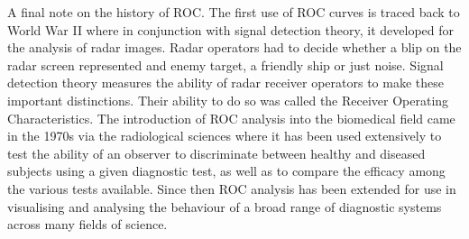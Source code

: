 \documentclass[a4paper,justified]{tufte-handout}
\begin{document}
\begin{fullwidth}
\vspace{3mm}
\noindent A final note on the history of ROC. The first use of ROC curves is traced back to World War II where in conjunction with signal detection theory, it developed for the analysis of radar images. Radar operators had to decide whether a blip on the radar screen represented and enemy target, a friendly ship or just noise. Signal detection theory measures the ability of radar receiver operators to make these important distinctions. Their ability to do so was called the Receiver Operating Characteristics. The introduction of ROC analysis into the biomedical field came in the 1970s via the radiological sciences where it has been used extensively to test the ability of an observer to discriminate between healthy and diseased subjects using a given diagnostic test, as well as to compare the efficacy among the various tests available. Since then ROC analysis has been extended for use in visualising and analysing the behaviour of a broad range of diagnostic systems across many fields of science. 




\end{fullwidth}
\end{document}
